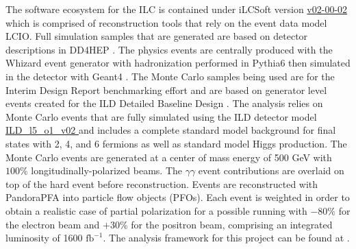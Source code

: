 



The software ecosystem for the ILC is contained under iLCSoft \cite{ilcsoft} version \url{v02-00-02} which is comprised of reconstruction tools that rely on the event data model LCIO\cite{lcio}. Full simulation samples that are generated are based on detector descriptions in DD4HEP \cite{dd4hep}. The physics events are centrally produced with the Whizard event generator \cite{ whizard} with hadronization performed in Pythia6 \cite{pythia6} then simulated in the detector with Geant4 \cite{geant4}. The Monte Carlo samples being used are for the Interim Design Report benchmarking effort \cite{ILDIDR} and are based on generator level events created for the ILD Detailed Baseline Design \cite{tdrdet}. The analysis relies on Monte Carlo events that are fully simulated using the ILD detector model \url{ ILD_l5_o1_v02 } and includes a complete standard model background for final states with 2, 4, and 6 fermions as well as standard model Higgs production.  The Monte Carlo events are generated at a center of mass energy of 500 GeV with $100\%$  longitudinally-polarized beams. The $\gamma \gamma$ event contributions are overlaid on top of the hard event before reconstruction. Events are reconstructed with PandoraPFA \cite{particleflowA} into particle flow objects (PFOs). Each event is weighted in order to obtain a realistic case of partial polarization for a possible running with $-80\%$ for the electron beam and $+30\%$ for the positron beam, comprising an integrated luminosity of 1600 $\text{fb}^{-1}$.  The analysis framework for this project can be found at \cite{wwrepo}. 



